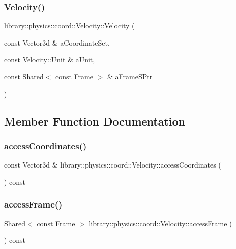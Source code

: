 \subsubsection{\texorpdfstring{Velocity()}{Velocity()}}
{\footnotesize\ttfamily library\+::physics\+::coord\+::\+Velocity\+::\+Velocity (\begin{DoxyParamCaption}\item[{const Vector3d \&}]{a\+Coordinate\+Set,  }\item[{const \hyperlink{classlibrary_1_1physics_1_1coord_1_1_velocity_a8bbc811932c454dbe0ab8b56f1b2c0b3}{Velocity\+::\+Unit} \&}]{a\+Unit,  }\item[{const Shared$<$ const \hyperlink{classlibrary_1_1physics_1_1coord_1_1_frame}{Frame} $>$ \&}]{a\+Frame\+S\+Ptr }\end{DoxyParamCaption})}



\subsection{Member Function Documentation}
\mbox{\label{classlibrary_1_1physics_1_1coord_1_1_velocity_aea8fe9c62293e20393d9a662f277b0e7}} 
\subsubsection{\texorpdfstring{access\+Coordinates()}{accessCoordinates()}}
{\footnotesize\ttfamily const Vector3d \& library\+::physics\+::coord\+::\+Velocity\+::access\+Coordinates (\begin{DoxyParamCaption}{ }\end{DoxyParamCaption}) const}

\mbox{\label{classlibrary_1_1physics_1_1coord_1_1_velocity_a1d3dc032dba7937276b06649cb16a871}} 
\subsubsection{\texorpdfstring{access\+Frame()}{accessFrame()}}
{\footnotesize\ttfamily Shared$<$ const \hyperlink{classlibrary_1_1physics_1_1coord_1_1_frame}{Frame} $>$ library\+::physics\+::coord\+::\+Velocity\+::access\+Frame (\begin{DoxyParamCaption}{ }\end{DoxyParamCaption}) const}

